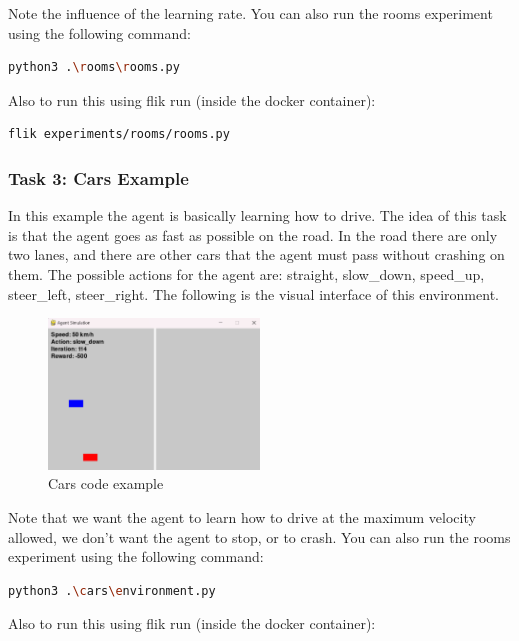 Note the influence of the learning rate. You can also run the rooms experiment using the following command:

\begin{lstlisting}[language=bash]
python3 .\rooms\rooms.py
\end{lstlisting}

Also to run this using flik run (inside the docker container):

\begin{lstlisting}[language=bash]
flik experiments/rooms/rooms.py
\end{lstlisting}

\subsubsection{Task 3: Cars Example}

In this example the agent is basically learning how to drive. The idea of this task is that the agent 
goes as fast as possible on the road. In the road there are only two lanes, and there are other cars 
that the agent must pass without crashing on them. The possible actions for the agent are: straight, 
slow\_down, speed\_up, steer\_left, steer\_right. The following is the visual interface of this environment.

\begin{figure}[h]
    \centering
    \includegraphics[width=0.5\textwidth]{figures/cars_example.png}
    \caption{Cars code example}
    \label{fig:cars-code-example}
\end{figure}

Note that we want the agent to learn how to drive at the maximum velocity allowed, we don’t want 
the agent to stop, or to crash. You can also run the rooms experiment using the following command:

\begin{lstlisting}[language=bash]
python3 .\cars\environment.py
\end{lstlisting}

Also to run this using flik run (inside the docker container):

